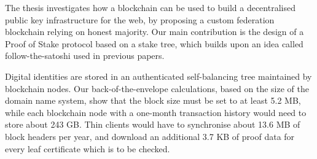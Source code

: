 The thesis investigates how a blockchain can be used to build a decentralised public key infrastructure for the web, by proposing a custom federation blockchain relying on honest majority. Our main contribution is the design of a Proof of Stake protocol based on a stake tree, which builds upon an idea called follow-the-satoshi used in previous papers.

Digital identities are stored in an authenticated self-balancing tree maintained by blockchain nodes. Our back-of-the-envelope calculations, based on the size of the domain name system, show that the block size must be set to at least 5.2 MB, while each blockchain node with a one-month transaction history would need to store about 243 GB. Thin clients would have to synchronise about 13.6 MB of block headers per year, and download an additional 3.7 KB of proof data for every leaf certificate which is to be checked.